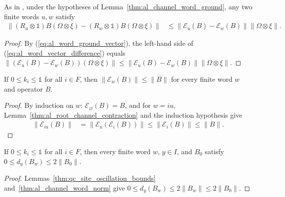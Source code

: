 \begin{lemma}
    \label{thm:al_channel_word_vector_difference}
    \leanok
    As in \cite[\texttt{09-amplification.tex}, lines 218--224]{OpenAI2026AreaLaw},
    under the hypotheses of Lemma~\ref{thm:al_channel_word_ground}, any two
    finite words $u,w$ satisfy
    \begin{align}
        \label{eq:al_word_vector_difference}
        \bigl\|(R_u\otimes\mathbb 1)B(\Omega\otimes\xi)
        -(R_w\otimes\mathbb 1)B(\Omega\otimes\xi)\bigr\|
         & \le\|\mathcal E_u(B)-\mathcal E_w(B)\|
        \|\Omega\otimes\xi\|.
    \end{align}
\end{lemma}
\begin{proof}
    \leanok
    By (\ref{eq:al_word_ground_vector}), the left-hand side of
    (\ref{eq:al_word_vector_difference}) equals
    $\|(\mathcal E_u(B)-\mathcal E_w(B))(\Omega\otimes\xi)\|\le
        \|\mathcal E_u(B)-\mathcal E_w(B)\|\|\Omega\otimes\xi\|$.
\end{proof}

\begin{lemma}
    \label{thm:al_channel_word_norm}
    \leanok
    If $0\le k_i\le\mathbb 1$ for all $i\in F$, then
    $\|\mathcal E_w(B)\|\le\|B\|$ for every finite word $w$ and operator $B$.
\end{lemma}
\begin{proof}
    \leanok
    By induction on $w$: $\mathcal E_{\varnothing}(B)=B$, and for $w=iu$,
    Lemma~\ref{thm:al_root_channel_contraction} and the induction hypothesis
    give
    \begin{align}
        \label{eq:al_word_norm_step}
        \|\mathcal E_{iu}(B)\|
         & =\|\mathcal E_u(\mathcal E_i(B))\|
        \le\|\mathcal E_i(B)\|\le\|B\|.
    \end{align}
\end{proof}

\begin{lemma}
    \label{thm:al_channel_word_oscillation}
    \leanok
    If $0\le k_i\le\mathbb 1$ for all $i\in F$, then every finite word $w$,
    $y\in I$, and $B_0$ satisfy $0\le d_y(B_w)\le2\|B_0\|$.
\end{lemma}
\begin{proof}
    \leanok
    Lemmas~\ref{thm:qc_site_oscillation_bounds}
    and~\ref{thm:al_channel_word_norm} give
    $0\le d_y(B_w)\le2\|B_w\|\le2\|B_0\|$.
\end{proof}

